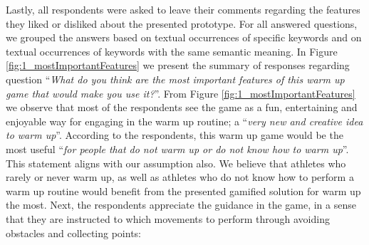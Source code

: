 Lastly, all respondents were asked to leave their comments regarding the features they liked or disliked about the presented prototype. For all answered questions, we grouped the answers based on textual occurrences of specific keywords and on textual occurrences of keywords with the same semantic meaning. In Figure \ref{fig:1_mostImportantFeatures} we present the summary of responses regarding question ``\textit{What do you think are the most important features of this warm up game that would make you use it?}''. From Figure \ref{fig:1_mostImportantFeatures} we observe that most of the respondents see the game as a fun, entertaining and enjoyable way for engaging in the warm up routine; a ``\textit{very new and creative idea to warm up}''. According to the respondents, this warm up game would be the most useful ``\textit{for people that do not warm up or do not know how to warm up}''. This statement aligns with our assumption also. We believe that athletes who rarely or never warm up, as well as athletes who do not know how to perform a warm up routine would benefit from the presented gamified solution for warm up the most. Next, the respondents appreciate the guidance in the game, in a sense that they are instructed to which movements to perform through avoiding obstacles and collecting points:
